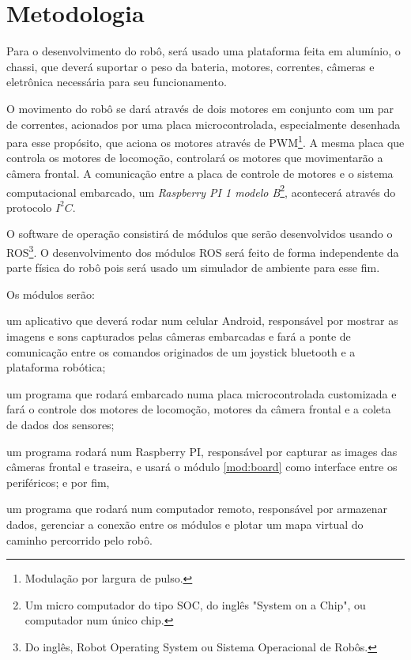 \documentclass[12pt,a4paper]{article}
\begin{document}
\section{Metodologia}
	Para o desenvolvimento do robô, será usado uma plataforma feita em alumínio, o chassi, que deverá suportar o peso da bateria, motores, correntes, câmeras e eletrônica necessária para seu funcionamento.\par
	O movimento do robô se dará através de dois motores em conjunto com um par de correntes, acionados por uma placa microcontrolada, especialmente desenhada para esse propósito, que aciona os motores através de PWM\footnote{Modulação por largura de pulso.}. A mesma placa que controla os motores de locomoção, controlará os motores que movimentarão a câmera frontal. A comunicação entre a placa de controle de motores e o sistema computacional embarcado, um \emph{Raspberry PI 1 modelo B}\footnote{Um micro computador do tipo SOC, do inglês "System on a Chip", ou computador num único chip.}, acontecerá através do protocolo $I^2C$.\par
	O software de operação consistirá de módulos que serão desenvolvidos usando o ROS\footnote{Do inglês, Robot Operating System ou Sistema Operacional de Robôs.}. O desenvolvimento dos módulos ROS será feito de forma independente da parte física do robô pois será usado um simulador de ambiente para esse fim.\par
	Os módulos serão: \begin{enumerate*} \item um aplicativo que deverá rodar num celular Android, responsável por mostrar as imagens e sons capturados pelas câmeras embarcadas e fará a ponte de comunicação entre os comandos originados de um joystick bluetooth e a plataforma robótica; \item \label{mod:board} um programa que rodará embarcado numa placa microcontrolada customizada e fará o controle dos motores de locomoção, motores da câmera frontal e a coleta de dados dos sensores; \item um programa rodará num Raspberry PI, responsável por capturar as images das câmeras frontal e traseira, e usará o módulo \ref{mod:board} como interface entre os periféricos; e por fim, \item um programa que rodará num computador remoto, responsável por armazenar dados, gerenciar a conexão entre os módulos e plotar um mapa virtual do caminho percorrido pelo robô.\end{enumerate*}\par
\end{document}
